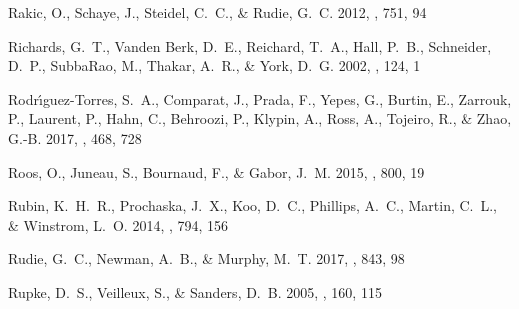 \documentclass[iop]{emulateapj}
\begin{document}
\begin{thebibliography}{54}
{Rakic}, O., {Schaye}, J., {Steidel}, C.~C., \& {Rudie}, G.~C. 2012, \apj, 751,
  94

{Richards}, G.~T., {Vanden Berk}, D.~E., {Reichard}, T.~A., {Hall}, P.~B.,
  {Schneider}, D.~P., {SubbaRao}, M., {Thakar}, A.~R., \& {York}, D.~G. 2002,
  \aj, 124, 1

{Rodr{\'{\i}}guez-Torres}, S.~A., {Comparat}, J., {Prada}, F., {Yepes}, G.,
  {Burtin}, E., {Zarrouk}, P., {Laurent}, P., {Hahn}, C., {Behroozi}, P.,
  {Klypin}, A., {Ross}, A., {Tojeiro}, R., \& {Zhao}, G.-B. 2017, \mnras, 468,
  728

{Roos}, O., {Juneau}, S., {Bournaud}, F., \& {Gabor}, J.~M. 2015, \apj, 800, 19

{Rubin}, K.~H.~R., {Prochaska}, J.~X., {Koo}, D.~C., {Phillips}, A.~C.,
  {Martin}, C.~L., \& {Winstrom}, L.~O. 2014, \apj, 794, 156

{Rudie}, G.~C., {Newman}, A.~B., \& {Murphy}, M.~T. 2017, \apj, 843, 98

{Rupke}, D.~S., {Veilleux}, S., \& {Sanders}, D.~B. 2005, \apjs, 160, 115


\end{thebibliography}
\end{document}
